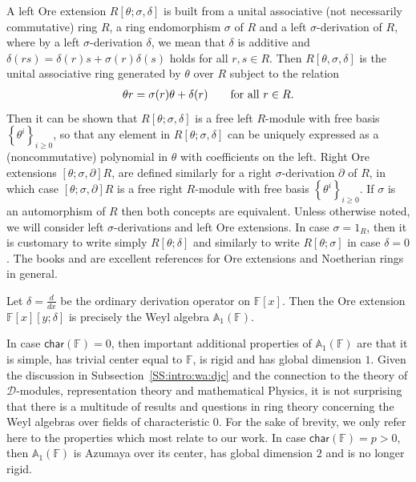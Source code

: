 \documentclass{commat}
\newcommand{\FF}{\mathbb{F}}
\newcommand{\wa}[1][1]{\mathbb{A}_{#1}}
\newcommand\chara{\mathsf {char}}
\newcommand{\pb}[1]{\left\{ #1\right\}}
\begin{document}
A left Ore extension $R[\theta;\sigma, \delta]$  is built from a unital associative (not necessarily commutative) ring $R$, a ring endomorphism $\sigma$ of $R$ and a left $\sigma$-derivation of $R$, where by a  left $\sigma$-derivation $\delta$,  we mean that  $\delta$ is additive and $\delta (rs) = \delta(r)s + \sigma (r) \delta (s)$ holds for all $r,s \in R$. Then $R[\theta, \sigma, \delta]$ is the unital associative ring generated by $\theta$ over $R$ subject to the relation
\begin{align*}
	\theta r= \sigma(r)\theta + \delta(r) \qquad \hbox{for all} \ r \in R.
\end{align*}
Then it can be shown that $R[\theta;\sigma, \delta]$ is a free left $R$-module with free basis $\pb{\theta^i}_{i\geq 0}$, so that any element in $R[\theta;\sigma, \delta]$ can be uniquely expressed as a (noncommutative) polynomial in $\theta$ with coefficients on the left. Right Ore extensions $[\theta;\sigma, \partial]R$, are defined similarly for a right $\sigma$-derivation $\partial$ of $R$, in which case $[\theta;\sigma, \partial]R$ is a free right $R$-module with free basis $\pb{\theta^i}_{i\geq 0}$. If $\sigma$ is an automorphism of $R$ then both concepts are equivalent. Unless otherwise noted, we will consider left $\sigma$-derivations and left Ore extensions. In case $\sigma=1_R$, then it is customary to write simply $R[\theta; \delta]$ and similarly to write $R[\theta;\sigma]$ in case $\delta=0$.
The books \cite{GW89} and \cite{MR00} are excellent references for Ore extensions and Noetherian rings in general.

\begin{example}
	Let $\delta=\frac{d}{dx}$ be the ordinary derivation operator on $\FF[x]$. Then the Ore extension $\FF[x][y;\delta]$ is precisely the Weyl algebra $\wa(\FF)$. 
\end{example}

In case $\chara(\FF)=0$, then important additional properties of $\wa(\FF)$ are that it is simple, has trivial center equal to $\FF$, is rigid and has global dimension $1$. Given the discussion in Subsection~\ref{SS:intro:wa:djc} and the connection to the theory of $\mathcal D$-modules, representation theory and mathematical Physics, it is not surprising that there is a multitude of results and questions in ring theory concerning the Weyl algebras over fields of characteristic $0$. For the sake of brevity, we only refer here to the properties which most relate to our work. In case $\chara(\FF)=p>0$, then $\wa(\FF)$ is Azumaya over its center, has global dimension $2$ and is no longer rigid.
\end{document}
